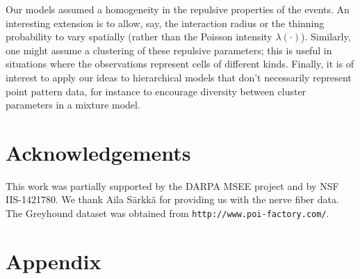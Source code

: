 \documentclass{statsoc}
\begin{document}
Our models assumed a homogeneity in the repulsive properties of the \matern events. An interesting extension is to allow, say, the interaction radius or 
the thinning probability to vary spatially (rather than the Poisson intensity $\lambda(\cdot)$). 
Similarly, one might assume a clustering of these repulsive parameters; %
this is useful in situations where the \matern observations represent cells of different kinds. 
Finally, it is of interest to apply our ideas to hierarchical models that don't necessarily represent point pattern data, for instance to encourage diversity between cluster parameters in a mixture model.


\section{Acknowledgements}
This work was partially supported by the DARPA MSEE project and by NSF IIS-1421780. We thank Aila S{\"a}rkk{\"a} for providing us with the nerve fiber data. The Greyhound dataset
was obtained from \texttt{http://www.poi-factory.com/}.
\appendix
\section{Appendix}

\setcounter{defn}{1}
\end{document}
